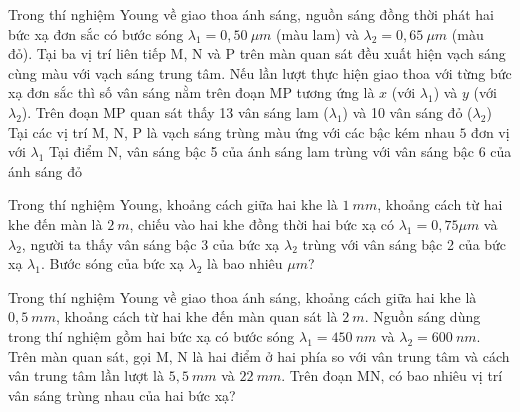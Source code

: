 \begin{ex}
Trong thí nghiệm Young về giao thoa ánh sáng, nguồn sáng đồng thời phát hai bức xạ đơn sắc có bước sóng $\lambda_1 = 0,50\ \mu m$ (màu lam) và $\lambda_2 = 0,65\ \mu m$ (màu đỏ). Tại ba vị trí liên tiếp M, N và P trên màn quan sát đều xuất hiện vạch sáng cùng màu với vạch sáng trung tâm. Nếu lần lượt thực hiện giao thoa với từng bức xạ đơn sắc thì số vân sáng nằm trên đoạn MP tương ứng là $x$ (với $\lambda_1$) và $y$ (với $\lambda_2$).
{Trên đoạn MP quan sát thấy 13 vân sáng lam ($\lambda_1$) và 10 vân sáng đỏ ($\lambda_2$)}
{Tại các vị trí M, N, P là vạch sáng trùng màu ứng với các bậc kém nhau $5$ đơn vị với $\lambda_1$}
{Tại điểm N, vân sáng bậc 5 của ánh sáng lam trùng với vân sáng bậc 6 của ánh sáng đỏ}
\loigiai{
\begin{itemchoice}
\itemch 
\itemch 
\itemch 
\itemch 
\end{itemchoice}
}
\end{ex}
\setcounter{ex}{0}
\PhanIII
\begin{ex}
Trong thí nghiệm Young, khoảng cách giữa hai khe là $1\ mm$, khoảng cách từ hai khe đến màn là $2\ m$, chiếu vào hai khe đồng thời hai bức xạ có $\lambda_{1} = 0,75 \mu m$ và $\lambda_{2}$, người ta thấy vân sáng bậc 3 của bức xạ $\lambda_{2}$ trùng với vân sáng bậc 2 của bức xạ $\lambda_{1}$. Bước sóng của bức xạ $\lambda_{2}$ là bao nhiêu $\mu m$?
\end{ex}
\begin{ex}
Trong thí nghiệm Young về giao thoa ánh sáng, khoảng cách giữa hai khe là $0,5\ mm$, khoảng cách từ hai khe đến màn quan sát là $2\ m$. Nguồn sáng dùng trong thí nghiệm gồm hai bức xạ có bước sóng $\lambda_1=450\ nm$ và $\lambda_2=600\ nm$. Trên màn quan sát, gọi M, N là hai điểm ở hai phía so với vân trung tâm và cách vân trung tâm lần lượt là $5,5\ mm$ và $22\ mm$. Trên đoạn MN, có bao nhiêu vị trí vân sáng trùng nhau của hai bức xạ?
\end{ex}
